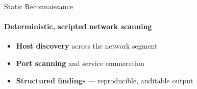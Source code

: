 
\begin{frame}{Static Reconnaissance}
  \framesubtitle{Deterministic, scripted network scanning}
  \begin{itemize}
    \setlength\itemsep{0.8em}
    \item[\faSearch] \textbf{Host discovery} across the network segment
    \item[\faNetworkWired] \textbf{Port scanning} and service enumeration
    \item[\faFile] \textbf{Structured findings} — reproducible, auditable output
  \end{itemize}
  \vspace{0.8em}
  \begin{block}{}
    \centering
  \end{block}
\end{frame}
